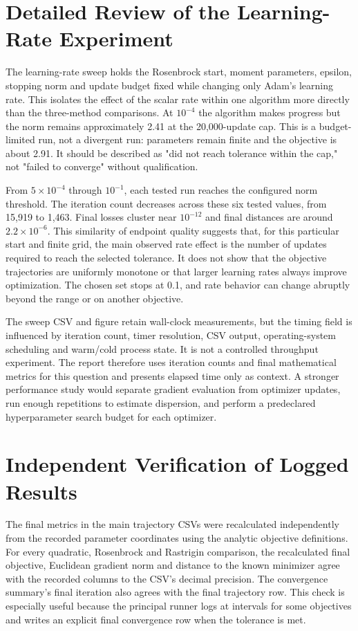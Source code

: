 \documentclass[conference]{IEEEtran}
\begin{document}
\section{Detailed Review of the Learning-Rate Experiment}
The learning-rate sweep holds the Rosenbrock start, moment parameters, epsilon, stopping norm and update budget fixed while changing only Adam's learning rate. This isolates the effect of the scalar rate within one algorithm more directly than the three-method comparisons. At $10^{-4}$ the algorithm makes progress but the norm remains approximately 2.41 at the 20,000-update cap. This is a budget-limited run, not a divergent run: parameters remain finite and the objective is about 2.91. It should be described as "did not reach tolerance within the cap," not "failed to converge" without qualification.

From $5\times10^{-4}$ through $10^{-1}$, each tested run reaches the configured norm threshold. The iteration count decreases across these six tested values, from 15,919 to 1,463. Final losses cluster near $10^{-12}$ and final distances are around $2.2\times10^{-6}$. This similarity of endpoint quality suggests that, for this particular start and finite grid, the main observed rate effect is the number of updates required to reach the selected tolerance. It does not show that the objective trajectories are uniformly monotone or that larger learning rates always improve optimization. The chosen set stops at 0.1, and rate behavior can change abruptly beyond the range or on another objective.

The sweep CSV and figure retain wall-clock measurements, but the timing field is influenced by iteration count, timer resolution, CSV output, operating-system scheduling and warm/cold process state. It is not a controlled throughput experiment. The report therefore uses iteration counts and final mathematical metrics for this question and presents elapsed time only as context. A stronger performance study would separate gradient evaluation from optimizer updates, run enough repetitions to estimate dispersion, and perform a predeclared hyperparameter search budget for each optimizer.
\section{Independent Verification of Logged Results}
The final metrics in the main trajectory CSVs were recalculated independently from the recorded parameter coordinates using the analytic objective definitions. For every quadratic, Rosenbrock and Rastrigin comparison, the recalculated final objective, Euclidean gradient norm and distance to the known minimizer agree with the recorded columns to the CSV's decimal precision. The convergence summary's final iteration also agrees with the final trajectory row. This check is especially useful because the principal runner logs at intervals for some objectives and writes an explicit final convergence row when the tolerance is met.
\end{document}
